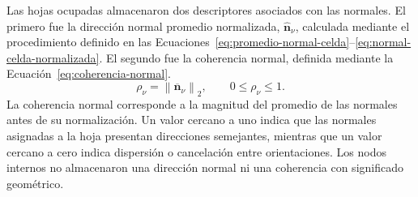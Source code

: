 Las hojas ocupadas almacenaron dos descriptores asociados con las normales. El primero fue la dirección normal promedio normalizada, $\widehat{\mathbf n}_\nu$, calculada mediante el procedimiento definido en las Ecuaciones~\eqref{eq:promedio-normal-celda}--\eqref{eq:normal-celda-normalizada}. El segundo fue la coherencia normal, definida mediante la Ecuación~\eqref{eq:coherencia-normal}.
\begin{equation}
\rho_\nu
=
\left\|
\overline{\mathbf n}_\nu
\right\|_2,
\qquad
0\leq\rho_\nu\leq 1.
\label{eq:coherencia-normal}
\end{equation}
La coherencia normal corresponde a la magnitud del promedio de las normales antes de su normalización. Un valor cercano a uno indica que las normales asignadas a la hoja presentan direcciones semejantes, mientras que un valor cercano a cero indica dispersión o cancelación entre orientaciones. Los nodos internos no almacenaron una dirección normal ni una coherencia con significado geométrico. 

